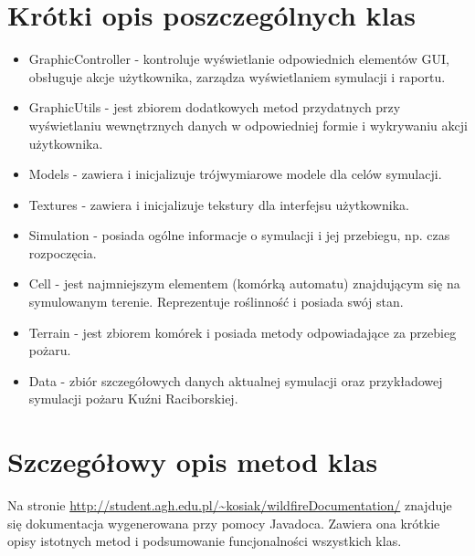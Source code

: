 \documentclass[a4paper, 11pt]{article}
\begin{document}
	\section{Krótki opis poszczególnych klas}
	\indent
	
		\begin{itemize}
			\item GraphicController - kontroluje wyświetlanie odpowiednich elementów GUI, obsługuje akcje użytkownika, zarządza wyświetlaniem symulacji i raportu.
			\item GraphicUtils - jest zbiorem dodatkowych metod przydatnych przy wyświetlaniu wewnętrznych danych w odpowiedniej formie i wykrywaniu akcji użytkownika.
			\item Models - zawiera i inicjalizuje trójwymiarowe modele dla celów symulacji.
			\item Textures - zawiera i inicjalizuje tekstury dla interfejsu użytkownika.
			\item Simulation - posiada ogólne informacje o symulacji i jej przebiegu, np. czas rozpoczęcia.
			\item Cell - jest najmniejszym elementem (komórką automatu) znajdującym się na symulowanym terenie. Reprezentuje roślinność i posiada swój stan.
			\item Terrain - jest zbiorem komórek i posiada metody odpowiadające za przebieg pożaru.
			\item Data - zbiór szczegółowych danych aktualnej symulacji oraz przykładowej symulacji pożaru Kuźni Raciborskiej.
		\end{itemize}
		
	
	\section{Szczegółowy opis metod klas}
	\indent
	
	Na stronie \url{http://student.agh.edu.pl/~kosiak/wildfireDocumentation/} znajduje się dokumentacja wygenerowana przy pomocy Javadoca. Zawiera ona krótkie opisy istotnych metod i podsumowanie funcjonalności wszystkich klas.
\end{document}
